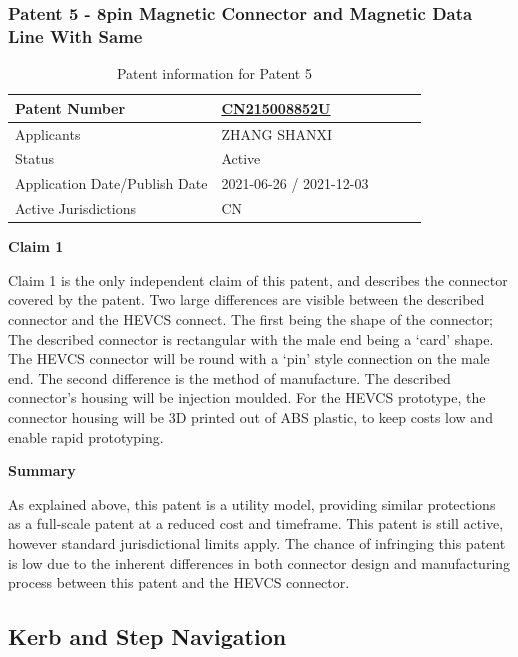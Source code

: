 \documentclass [12pt]{article}
\begin{document}
\subsubsection{Patent 5 - 8pin Magnetic Connector and Magnetic Data Line With Same}
\begin{table}[H]
    \centering
    \setlength{\arrayrulewidth}{1.5pt}
    \begin{tabular}{|p{0.5\linewidth}|p{0.5\linewidth}|}
    \hline
    Patent Number & \href{https://worldwide.espacenet.com/patent/search/family/079083033/publication/CN215008852U?q=CN215008852U}{CN215008852U}\\
    \hline
    Applicants &ZHANG SHANXI\\
    \hline
    Status & Active\\
    \hline
    Application Date/Publish Date & 2021-06-26 / 2021-12-03\\
    \hline
    Active Jurisdictions & CN\\
    \hline
    \end{tabular}
    \caption{Patent information for Patent 5}
    \label{table:mag_con5}
\end{table}
\textbf{Claim 1}

Claim 1 is the only independent claim of this patent, and describes the connector covered by the patent. Two large differences are visible between the described connector and the HEVCS connect. The first being the shape of the connector; The described connector is rectangular with the male end being a ‘card’ shape. The HEVCS connector will be round with a ‘pin’ style connection on the male end.
The second difference is the method of manufacture. The described connector’s housing will be injection moulded. For the HEVCS prototype, the connector housing will be 3D printed out of ABS plastic, to keep costs low and enable rapid prototyping.

\textbf{Summary}

As explained above, this patent is a utility model, providing similar protections as a full-scale patent at a reduced cost and timeframe. This patent is still active, however standard jurisdictional limits apply. The chance of infringing this patent is low due to the inherent differences in both connector design and manufacturing process between this patent and the HEVCS connector.


\subsection{Kerb and Step Navigation}\label{sec:kerb_step_navigation}
\end{document}
